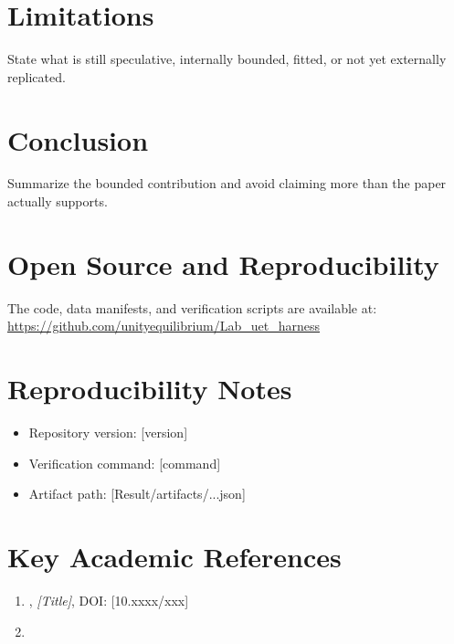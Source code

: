 \documentclass[11pt,a4paper,oneside]{article}
\begin{document}
\section{Limitations}
State what is still speculative, internally bounded, fitted, or not yet externally
replicated.

\section{Conclusion}
Summarize the bounded contribution and avoid claiming more than the paper actually supports.

\section*{Open Source and Reproducibility}
The code, data manifests, and verification scripts are available at: \\
\url{https://github.com/unityequilibrium/Lab_uet_harness}

\section*{Reproducibility Notes}
\begin{itemize}
    \item Repository version: [version]
    \item Verification command: [command]
    \item Artifact path: [Result/artifacts/...json]
\end{itemize}


\section*{Key Academic References}
\begin{enumerate}
    \item [Author Name], \textit{[Title]}, DOI: [10.xxxx/xxx]
    \item [Benchmark or comparison source]
\end{enumerate}
\end{document}
